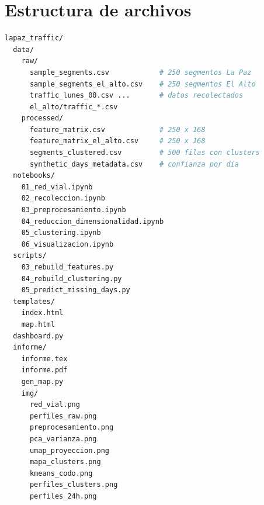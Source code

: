 \documentclass[12pt,a4paper]{article}
\begin{document}
\section{Estructura de archivos}

\begin{lstlisting}[language=bash, caption={Árbol de directorios del proyecto.},
    keywordstyle=\color{azulAS}]
lapaz_traffic/
  data/
    raw/
      sample_segments.csv            # 250 segmentos La Paz
      sample_segments_el_alto.csv    # 250 segmentos El Alto
      traffic_lunes_00.csv ...       # datos recolectados
      el_alto/traffic_*.csv
    processed/
      feature_matrix.csv             # 250 x 168
      feature_matrix_el_alto.csv     # 250 x 168
      segments_clustered.csv         # 500 filas con clusters
      synthetic_days_metadata.csv    # confianza por dia
  notebooks/
    01_red_vial.ipynb
    02_recoleccion.ipynb
    03_preprocesamiento.ipynb
    04_reduccion_dimensionalidad.ipynb
    05_clustering.ipynb
    06_visualizacion.ipynb
  scripts/
    03_rebuild_features.py
    04_rebuild_clustering.py
    05_predict_missing_days.py
  templates/
    index.html
    map.html
  dashboard.py
  informe/
    informe.tex
    informe.pdf
    gen_map.py
    img/
      red_vial.png
      perfiles_raw.png
      preprocesamiento.png
      pca_varianza.png
      umap_proyeccion.png
      mapa_clusters.png
      kmeans_codo.png
      perfiles_clusters.png
      perfiles_24h.png
\end{lstlisting}
\end{document}
